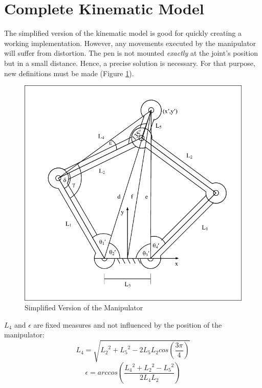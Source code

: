 \documentclass[11pt, oneside]{article}   %
\begin{document}
\section{Complete Kinematic Model}
The simplified version of the kinematic model is good for quickly creating a working implementation. However, any movements executed by the manipulator will suffer from distortion. The pen is not mounted \emph{exactly} at the joint's position but in a small distance. Hence, a precise solution is necessary. For that purpose, new definitions must be made (Figure \ref{fig:model2}).
\begin{figure}[!h]
	\label{fig:model2}
	\centering
	\includegraphics[scale=1]{LinkDiagramComplicated_try.pdf}
	\caption{Simplified Version of the Manipulator}
\end{figure}

$L_4$ and $\epsilon$ are fixed measures and not influenced by the position of the manipulator:
\begin{equation}
L_4 = \sqrt{{L_2}^2 + {L_5}^2 - 2L_5L_2cos\left(\frac{3\pi}{4}\right)}
\label{eqn:L4}
\end{equation}
\begin{equation}
\epsilon = arccos\left(  \frac{{L_4}^2 + {L_2}^2 - {L_5}^2}{2L_4L_2} \right)
\label{eqn:tepsilon}
\end{equation}
\end{document}
